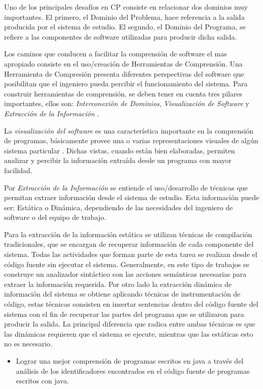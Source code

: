 \documentclass[12pt]{report}
\begin{document}
Uno de los principales desafíos en CP consiste en relacionar 
dos dominios muy importantes. 
El primero, el Dominio del Problema, hace referencia a la salida producida por el sistema de estudio. El segundo, el Dominio del Programa, se refiere a las componentes de software utilizadas para producir dicha salida.

Los caminos que conducen a facilitar la comprensión de software el mas apropiado consiste 
en el uso/creación de Herramientas de Comprensión. 
Una Herramienta de Compresión presenta diferentes perspectivas del software que posibilitan que el ingeniero pueda percibir el funcionamiento del sistema. 
Para construir herramientas de comprensión, se deben tener en cuenta tres pilares importantes, ellos son: \textit{Interconexión de Dominios}, 
\textit{Visualización de Software} y 
\textit{Extracción de la Información} \cite{STOREY99,BROOK82}.

La \textit{visualización del software} es una característica importante en la comprensión de programas, básicamente provee una o varias representaciones visuales de algún sistema particular \cite{BRM10}.
Dichas vistas, cuando están bien elaboradas, permiten analizar y percibir la información extraída desde un programa con mayor facilidad.

Por \textit{Extracción de la Información} se entiende el uso/desarrollo de técnicas que 
permitan extraer información desde el sistema de estudio. 
Esta información puede ser: Estática o Dinámica, dependiendo de las necesidades del 
ingeniero de software o del equipo de trabajo.

Para la extracción de la información estática se utilizan técnicas de compilación tradicionales, que se encargan de recuperar información de cada componente del sistema. Todas las actividades que forman parte de esta tarea se realizan desde el código fuente sin ejecutar el sistema. Generalmente, en este tipo de trabajos se construye un analizador sintáctico con las acciones semánticas necesarias para extraer la información requerida.
Por otro lado la extracción dinámica de información del sistema se obtiene  
aplicando técnicas de instrumentación de código, estas técnicas consisten en insertar sentencias dentro del código fuente del sistema con el fin de recuperar las partes del programa que se utilizaron para 
producir la salida. 
La principal diferencia que radica entre ambas técnicas es que las dinámicas requieren que el sistema se ejecute, mientras que las estáticas esto no es necesario.

\begin{itemize}
\item Lograr una mejor comprensión de programas escritos en java a través del análisis de los identificadores encontrados en el código fuente de programas escritos con java.
\end{itemize}
\end{document}
